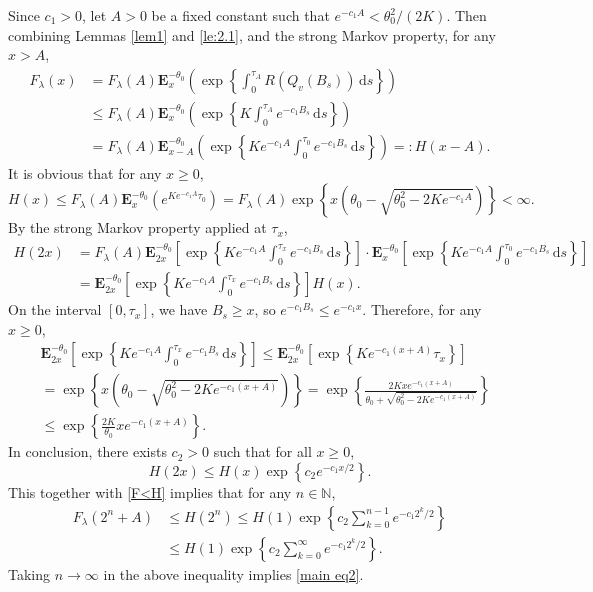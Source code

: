 \documentclass[10pt,a4paper]{amsart}
\numberwithin{equation}{section}
\begin{document}
Since $c_1>0$,  let $A>0$ be a fixed constant such that $e^{-c_1 A} < \theta_0^2/(2K)$. Then combining Lemmas \ref{lem1} and  \ref{le:2.1}, and the strong Markov property, 
 for any $x>A$,
\begin{align}\label{F<H}
	F_\lambda(x)
	&= 
	F_\lambda(A) \mathbf E_x^{-\theta_0} \left( \exp\left\{ \int_0^{\tau_A} R(Q_v(B_s)) \, \mathrm{d}s \right\} \right) 
	\nonumber \\
	&\le 
	F_\lambda(A)  \mathbf E_x^{-\theta_0} \left( \exp\left\{ K \int_0^{\tau_A} e^{-c_1 B_s} \, \mathrm{d}s \right\} \right)\nonumber\\
	& = 	F_\lambda(A)  \mathbf E_{x-A}^{-\theta_0} \left( \exp\left\{ Ke^{-c_1 A} \int_0^{\tau_0} e^{-c_1 B_s} \, \mathrm{d}s \right\} \right)
	 =: H(x-A).
\end{align}
It is obvious that  for any $x\geq 0$,
\[
H(x)\leq F_\lambda(A)  \mathbf E_{x}^{-\theta_0} \left( e^{Ke^{-c_1 A}  \tau_0}\right) = 
F_\lambda(A)
\exp\left\{x\left(\theta_0 -\sqrt{\theta_0^2-2Ke^{-c_1 A}}\right)\right\}<\infty. 
\]
By the strong Markov property applied at $\tau_x$,
\begin{align*}
	H(2x)
	&= 
	F_\lambda(A)\mathbf E_{2x}^{-\theta_0} \left[ \exp\left\{ Ke^{-c_1A} \int_0^{\tau_x} e^{-c_1 B_s} \, \mathrm{d}s \right\} \right]	\cdot \mathbf E_x^{-\theta_0} \left[ \exp\left\{ K e^{-c_1A} \int_0^{\tau_0} e^{-c_1 B_s} \, \mathrm{d}s \right\} \right] \\
	&=
	\mathbf E_{2x}^{-\theta_0} \left[ \exp\left\{ Ke^{-c_1A} \int_0^{\tau_x} e^{-c_1 B_s} \, \mathrm{d}s \right\} \right] H(x).
\end{align*}
On the interval $[0, \tau_x]$, we have $B_s \ge x$, so $e^{-c_1 B_s} \le e^{-c_1 x}$. 
Therefore, for any $x\geq 0$, 
\begin{align*}
	&\mathbf E_{2x}^{-\theta_0} \left[ \exp\left\{ Ke^{-c_1A} \int_0^{\tau_x} e^{-c_1 B_s} \, \mathrm{d}s \right\} \right]	\le \mathbf E_{2x}^{-\theta_0} \left[ \exp\left\{ K e^{-c_1 (x+A)} \tau_x \right\} \right] \\	&= \exp\left\{ x \left( \theta_0 - \sqrt{\theta_0^2 - 2K e^{-c_1 (x+A)}} \right) \right\} = \exp\left\{ \frac{2K xe^{-c_1(x+A)}}{\theta_0+ \sqrt{\theta_0^2 - 2K e^{-c_1 (x+A)}} }\right\}   \\	&\le \exp\left\{ \frac{2K}{\theta_0} x e^{-c_1 (x+A)} \right\}.
\end{align*}
In conclusion,
 there exists $c_2 > 0$ such that for all 
 $x\geq 0$,
\begin{equation*}
	H(2x) \le H(x) \exp\left\{ c_2 e^{-c_1 x/2} \right\}.
\end{equation*}
This together with \eqref{F<H} implies that for any $n \in \mathbb{N}$,
\begin{align*}
	F_\lambda(2^n +A) 	&\le H(2^n ) 	\le H(1) \exp\left\{ c_2 \sum_{k=0}^{n-1} e^{-c_1 2^k  / 2} \right\} \\	&\le H(1) \exp\left\{ c_2 \sum_{k=0}^{\infty} e^{-c_1 2^k  / 2} \right\}.
\end{align*}
Taking $n \to \infty$ in the above inequality implies \eqref{main eq2}.
\end{document}
